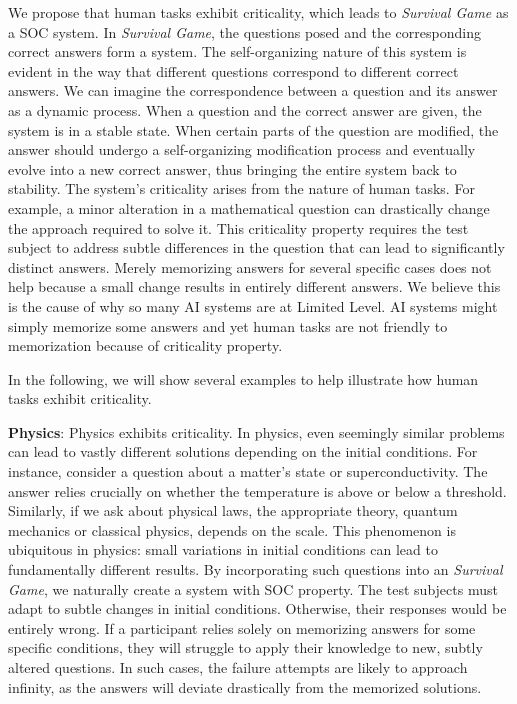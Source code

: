 We propose that human tasks exhibit criticality, which leads to \textit{Survival Game} as a SOC system.  In \textit{Survival Game}, the questions posed and the corresponding correct answers form a system. The self-organizing nature of this system is evident in the way that different questions correspond to different correct answers. We can imagine the correspondence between a question and its answer as a dynamic process. When a question and the correct answer are given, the system is in a stable state. When certain parts of the question are modified, the answer should undergo a self-organizing modification process and eventually evolve into a new correct answer, thus bringing the entire system back to stability. The system’s criticality arises from the nature of human tasks. For example, a minor alteration in a mathematical question can drastically change the approach required to solve it. This criticality property requires the test subject to address subtle differences in the question that can lead to significantly distinct answers. Merely memorizing answers for several specific cases does not help because a small change results in entirely different answers. We believe this is the cause of why so many AI systems are at Limited Level. AI systems might simply memorize some answers and yet human tasks are not friendly to memorization because of criticality property.

In the following, we will show several examples to help illustrate how human tasks exhibit criticality.


\textbf{Physics}:
Physics exhibits criticality. In physics, even seemingly similar problems can lead to vastly different solutions depending on the initial conditions. For instance, consider a question about a matter's state or superconductivity. The answer relies crucially on whether the temperature is above or below a threshold. Similarly, if we ask about physical laws, the appropriate theory, quantum mechanics or classical physics, depends on the scale. This phenomenon is ubiquitous in physics: small variations in initial conditions can lead to fundamentally different results.
By incorporating such questions into an \textit{Survival Game}, we naturally create a system with SOC property. The test subjects must adapt to subtle changes in initial conditions. Otherwise, their responses would be entirely wrong. If a participant relies solely on memorizing answers for some specific conditions, they will struggle to apply their knowledge to new, subtly altered questions. In such cases, the failure attempts are likely to approach infinity, as the answers will deviate drastically from the memorized solutions.

